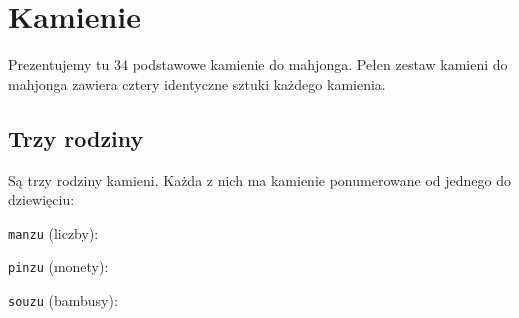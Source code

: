 \section*{Kamienie}

Prezentujemy tu 34 podstawowe kamienie do mahjonga. Pełen zestaw kamieni do mahjonga zawiera cztery identyczne sztuki każdego kamienia.

\subsection*{Trzy rodziny}

Są trzy rodziny kamieni. Każda z nich ma kamienie ponumerowane od jednego do dziewięciu:

\texttt{manzu} (liczby): 

\texttt{pinzu} (monety): 

\texttt{souzu} (bambusy): 
